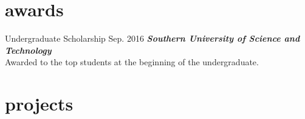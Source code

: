 \documentclass[hidelinks__VERSION__]{adamyi-cv}
\begin{document}

\section{awards}

\begin{entrylist}


\entry
{Undergraduate Scholarship}
{Sep. 2016}
{\emph{\textbf{Southern University of Science and Technology}}\\
Awarded to the top students at the beginning of the undergraduate.
}


\end{entrylist}

\pagebreak


\section{projects}
\end{document}
